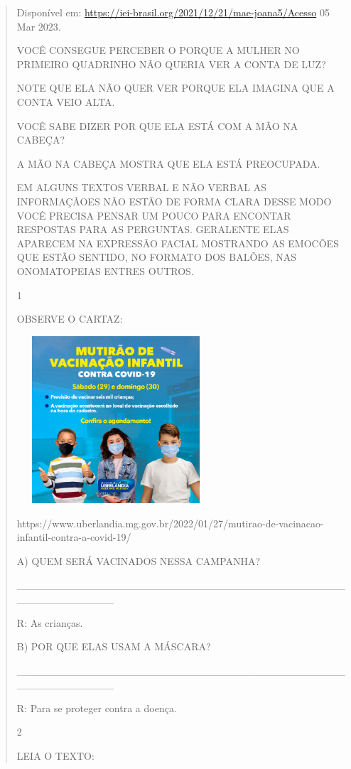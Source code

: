 {{{{\begin{verse}
{{\begin{escolha}
{{{{{{Disponível em: \url{https://iei-brasil.org/2021/12/21/mae-joana5/Acesso}
05 Mar 2023.

VOCÊ CONSEGUE PERCEBER O PORQUE A MULHER NO PRIMEIRO QUADRINHO NÃO
QUERIA VER A CONTA DE LUZ?

NOTE QUE ELA NÃO QUER VER PORQUE ELA IMAGINA QUE A CONTA VEIO ALTA.

VOCÊ SABE DIZER POR QUE ELA ESTÁ COM A MÃO NA CABEÇA?

A MÃO NA CABEÇA MOSTRA QUE ELA ESTÁ PREOCUPADA.

EM ALGUNS TEXTOS VERBAL E NÃO VERBAL AS INFORMAÇÃOES NÃO ESTÃO DE FORMA
CLARA DESSE MODO VOCÊ PRECISA PENSAR UM POUCO PARA ENCONTAR RESPOSTAS
PARA AS PERGUNTAS. GERALENTE ELAS APARECEM NA EXPRESSÃO FACIAL MOSTRANDO
AS EMOCÕES QUE ESTÃO SENTIDO, NO FORMATO DOS BALÕES, NAS ONOMATOPEIAS
ENTRES OUTROS.}


\num{1}

OBSERVE O CARTAZ:

\includegraphics[width=2.89864in,height=2.45070in]{media/image128.png}

https://www.uberlandia.mg.gov.br/2022/01/27/mutirao-de-vacinacao-infantil-contra-a-covid-19/

A) QUEM SERÁ VACINADOS NESSA CAMPANHA?

\_\_\_\_\_\_\_\_\_\_\_\_\_\_\_\_\_\_\_\_\_\_\_\_\_\_\_\_\_\_\_\_\_\_\_\_\_\_\_\_\_\_\_\_\_\_\_\_\_\_\_\_\_\_\_\_\_

R: As crianças.

B) POR QUE ELAS USAM A MÁSCARA?

\_\_\_\_\_\_\_\_\_\_\_\_\_\_\_\_\_\_\_\_\_\_\_\_\_\_\_\_\_\_\_\_\_\_\_\_\_\_\_\_\_\_\_\_\_\_\_\_\_\_\_\_\_\_\_\_\_

R: Para se proteger contra a doença.

\num{2}

LEIA O TEXTO:

}}}}}
\end{escolha}}}
\end{verse}}}}}
